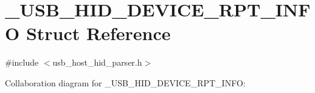 \hypertarget{struct___u_s_b___h_i_d___d_e_v_i_c_e___r_p_t___i_n_f_o}{}\section{\+\_\+\+U\+S\+B\+\_\+\+H\+I\+D\+\_\+\+D\+E\+V\+I\+C\+E\+\_\+\+R\+P\+T\+\_\+\+I\+N\+F\+O Struct Reference}
\label{struct___u_s_b___h_i_d___d_e_v_i_c_e___r_p_t___i_n_f_o}


{\ttfamily \#include $<$usb\+\_\+host\+\_\+hid\+\_\+parser.\+h$>$}



Collaboration diagram for \+\_\+\+U\+S\+B\+\_\+\+H\+I\+D\+\_\+\+D\+E\+V\+I\+C\+E\+\_\+\+R\+P\+T\+\_\+\+I\+N\+F\+O\+:
